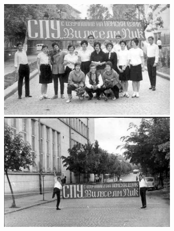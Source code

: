 \begin{multicols}{2}
\includegraphics[width=3.4in]{./zdravei_az/2-4.jpg}
\includegraphics[width=3.4in]{./zdravei_az/2-5.jpg}

\closearticle
\end{multicols}
